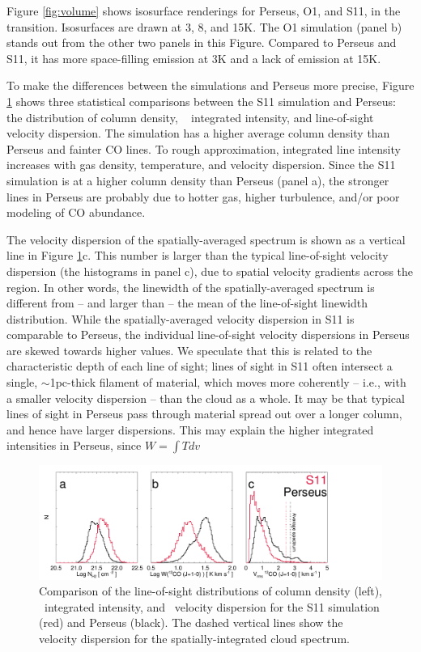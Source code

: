 Figure \ref{fig:volume} shows isosurface renderings for Perseus, O1, and S11, in the \coa\, transition. Isosurfaces are drawn at 3, 8, and 15K. The O1 simulation (panel b) stands out from the other two panels in this Figure. Compared to Perseus and S11, it has more space-filling emission at 3K and a lack of emission at 15K.

To make the differences between the simulations and Perseus more precise, Figure \ref{fig:diagnostic_rahul} shows three statistical comparisons between the S11 simulation and Perseus: the distribution of
column density, \coa~ integrated intensity, and line-of-sight velocity dispersion. The simulation has a higher average column density than Perseus and fainter CO lines. To rough approximation, integrated line intensity increases with gas density, temperature, and velocity dispersion. Since the S11 simulation is at a higher column density than Perseus (panel a), the stronger lines in Perseus are probably due to hotter gas, higher turbulence, and/or poor modeling of CO abundance.

The velocity dispersion of the spatially-averaged spectrum is shown as a vertical line in Figure \ref{fig:diagnostic_rahul}c. This number is larger than the typical line-of-sight velocity dispersion (the histograms in panel c), due to spatial velocity gradients across the region. In other words, the linewidth of the spatially-averaged spectrum is different from -- and larger than -- the mean of the line-of-sight linewidth distribution. While the spatially-averaged velocity dispersion in S11 is comparable to Perseus, the individual line-of-sight velocity dispersions in Perseus are skewed towards higher values. We
speculate that this is related to the characteristic depth of each line
of sight; lines of sight in S11 often intersect a single, $\sim$1pc-thick
 filament of material, which moves more coherently  -- i.e., with a
smaller velocity dispersion -- than the cloud as a whole. It may be that
typical lines of sight in Perseus pass through material spread out over
a longer column, and hence have larger dispersions. This may explain the higher integrated intensities in Perseus, since $W = \int T dv$

\begin{figure}[htbp]
\centering
\includegraphics[width=7in]{figures/rahul_diagnostic}
\caption{Comparison of the line-of-sight distributions of column density (left), \coa\, integrated intensity, and \coa\, velocity dispersion for the S11 simulation (red) and Perseus (black). The dashed vertical lines show the velocity dispersion for the spatially-integrated cloud spectrum.}
\label{fig:diagnostic_rahul}
\end{figure}

